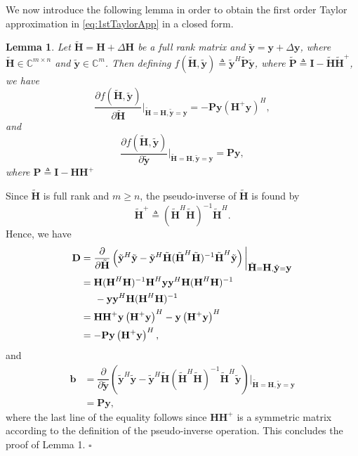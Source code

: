 \documentclass[review,sort&compress]{elsarticle}
\newtheorem{lem}{Lemma}
\renewcommand{\vec}[1]{\mbox{$\mathbf{#1}$}}
\newcommand{\defi}{\triangleq}
\newcommand{\nn}{\nonumber}
\newcommand{\C}{\mathbb{C}}
\newcommand{\vH}{\vec{H}}
\newcommand{\vy}{\vec{y}}
\newcommand{\dH}{\Delta\vH}
\newcommand{\dy}{\Delta\vy}
\newcommand{\tH}{\tilde{\vec{H}}}
\newcommand{\ty}{\tilde{\vec{y}}}
\newcommand{\tP}{\tilde{\vec{P}}}
\newcommand{\vP}{\vec{P}}
\newcommand{\vD}{\vec{D}}
\newcommand{\vI}{\vec{I}}
\newcommand{\vb}{\vec{b}}
\begin{document}
We now introduce the following lemma in order to obtain the first order Taylor approximation in \eqref{eq:1stTaylorApp} in a closed form.

\begin{lem}\label{lem1}
Let $\tH =\vH+\dH$ be a full rank matrix and $\ty=\vy+\dy$, where $\tH \in \C^{m \times n}$ and $\ty \in \C^m$. Then defining $f\left(\tH, \ty \right) \triangleq \ty^H\tP\ty$, where $\tP \triangleq \vI-\tH\tH^+$, we have
\[
\dfrac{\partial f\left(\tH, \ty \right)}{\partial \tH}\bigg\vert_{\tH=\vH, \ty=\vy} = - \vP \vy \left( \vH^+ \vy \right)^H,
\]
and
\[
\dfrac{\partial f\left(\tH, \ty \right)}{\partial \ty}\bigg\vert_{\tH=\vH, \ty=\vy} = \vP \vy,
\]
where $\vP \triangleq \vI-\vH\vH^+$
\end{lem}

\begin{pol1}
Since $\tH$ is full rank and $m \geq n$, the pseudo-inverse of $\tH$ is found by \cite{graham}
\[
\tH^+ \defi (\tH^H\tH)^{-1}\tH^H.
\]
Hence, we have \cite{graham}
\begin{align}\label{eq:D_definition}
  \vD & = \dfrac{\partial}{\partial \tH} \left( \ty^H \ty - \ty^H \tH (\tH^H\tH)^{-1}\tH^H \ty \right) \bigg\vert_{\tH=\vH, \ty=\vy} \nn\\
      & = \vH(\vH^H\vH)^{-1}\vH^H\vy\vy^H\vH(\vH^H\vH)^{-1} \nn\\
      & \hspace{0.5cm} - \vy\vy^H \vH(\vH^H \vH)^{-1} \nn\\
      & = \vH \vH^+ \vy \left( \vH^+ \vy \right)^H - \vy \left( \vH^+ \vy \right)^H \nn\\
      & = - \vP \vy \left( \vH^+ \vy \right)^H,
\end{align}
and
\begin{align}\label{eq:b_definition}
  \vb & = \dfrac{\partial}{\partial \ty} \left( \ty^H \ty - \ty^H \tH (\tH^H\tH)^{-1}\tH^H \ty \right) \bigg\vert_{\tH=\vH, \ty=\vy} \nn\\
      & = \vP \vy,
\end{align}
where the last line of the equality follows since $\vH \vH^+$ is a symmetric matrix according to the definition of the pseudo-inverse operation. This concludes the proof of Lemma 1. \hfill $\square$
\end{pol1}
\end{document}

